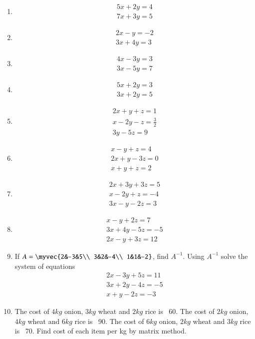 \documentclass{article}
\theoremstyle{remark}
\begin{document}
\begin{enumerate}[resume]
\item   \label{prob:7}
\begin{align}
5x+2y = 4\\
7x+3y = 5
\end{align}
\item 
\begin{align}
 2x-y = -2\\
 3x+4y = 3
\end{align}
\item
\begin{align}
 4x-3y = 3\\
 3x-5y = 7
\end{align}
\item
\begin{align} 
 5x+2y = 3\\
 3x+2y = 5
\end{align}
\item
\begin{align}
 2x+y+z = 1\\
 x-2y-z = \frac{3}{2} \\
 3y-5z = 9
\end{align}
\item
\begin{align}
 x-y+z = 4\\
 2x+y-3z = 0\\
 x+y+z = 2
\end{align}
\item
\begin{align}
 2x+3y+3z = 5\\
 x-2y+z = -4\\
 3x-y-2z = 3
\end{align}
\item   \label{prob:14}
\begin{align}
 x-y+2z = 7\\
 3x+4y-5z = -5\\
 2x-y+3z = 12
\end{align}
\item If $A=\myvec{2&-3&5\\ 3&2&-4\\ 1&1&-2}$, find $A^{-1}$. Using $A^{-1}$ solve the system of equations
\begin{align}
 2x-3y+5z =  11\\
 3x+2y-4z = -5\\
 x+y-2z = -3
\end{align}
\item The cost of $4 kg$ onion, $3 kg$ wheat and $2 kg$ rice is \rupee~60. The cost of $2 kg$ onion, $4 kg$ wheat and $6 kg$ rice is \rupee~90. The cost of $6 kg$ onion, $2 kg$ wheat and $3 kg$ rice is \rupee~70. Find cost of each item per kg by matrix method.
\end{enumerate}
\end{document}
